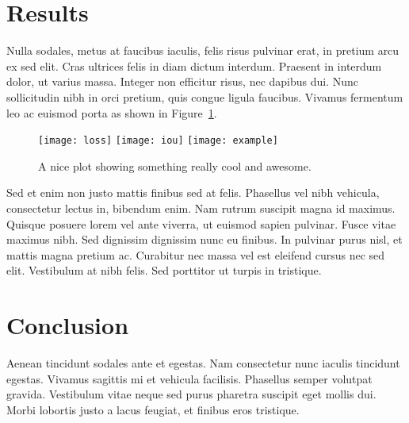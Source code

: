 \documentclass[9pt]{IEEEtran}
\begin{document}
\section{Results}
Nulla sodales, metus at faucibus iaculis, felis risus pulvinar erat, in pretium arcu ex sed elit. Cras ultrices felis in diam dictum interdum. Praesent in interdum dolor, ut varius massa. Integer non efficitur risus, nec dapibus dui. Nunc sollicitudin nibh in orci pretium, quis congue ligula faucibus. Vivamus fermentum leo ac euismod porta as shown in Figure~\ref{fig:plot1}.

\begin{figure}[h]
    \centering
    \texttt{[image: loss]}
    \texttt{[image: iou]}
    \texttt{[image: example]}
    \caption{A nice plot showing something really cool and awesome.}
    \label{fig:plot1}
\end{figure}
 
Sed et enim non justo mattis finibus sed at felis. Phasellus vel nibh vehicula, consectetur lectus in, bibendum enim. Nam rutrum suscipit magna id maximus. Quisque posuere lorem vel ante viverra, ut euismod sapien pulvinar. Fusce vitae maximus nibh. Sed dignissim dignissim nunc eu finibus. In pulvinar purus nisl, et mattis magna pretium ac. Curabitur nec massa vel est eleifend cursus nec sed elit. Vestibulum at nibh felis. Sed porttitor ut turpis in tristique.

 \section{Conclusion}

Aenean tincidunt sodales ante et egestas. Nam consectetur nunc iaculis tincidunt egestas. Vivamus sagittis mi et vehicula facilisis. Phasellus semper volutpat gravida. Vestibulum vitae neque sed purus pharetra suscipit eget mollis dui. Morbi lobortis justo a lacus feugiat, et finibus eros tristique.



\end{document}
